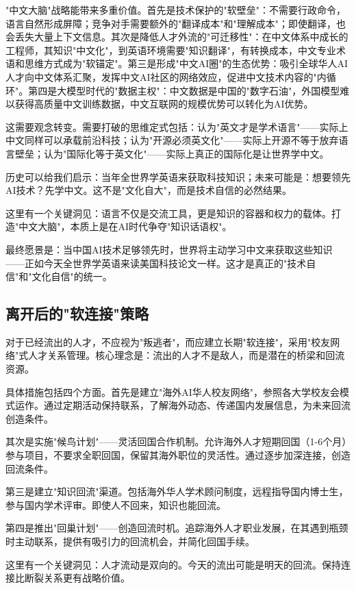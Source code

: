 "中文大脑"战略能带来多重价值。首先是技术保护的"软壁垒"：不需要行政命令，语言自然形成屏障；竞争对手需要额外的"翻译成本"和"理解成本"；即使翻译，也会丢失大量上下文信息。其次是降低人才外流的"可迁移性"：在中文体系中成长的工程师，其知识"中文化"，到英语环境需要"知识翻译"，有转换成本，中文专业术语和思维方式成为"软锚定"。第三是形成"中文AI圈"的生态优势：吸引全球华人AI人才向中文体系汇聚，发挥中文AI社区的网络效应，促进中文技术内容的"内循环"。第四是大模型时代的"数据主权"：中文数据是中国的"数字石油"，外国模型难以获得高质量中文训练数据，中文互联网的规模优势可以转化为AI优势。

这需要观念转变。需要打破的思维定式包括：认为"英文才是学术语言"——实际上中文同样可以承载前沿科技；认为"开源必须英文化"——实际上开源不等于放弃语言壁垒；认为"国际化等于英文化"——实际上真正的国际化是让世界学中文。

历史可以给我们启示：当年全世界学英语来获取科技知识；未来可能是：想要领先AI技术？先学中文。这不是"文化自大"，而是技术自信的必然结果。

这里有一个关键洞见：语言不仅是交流工具，更是知识的容器和权力的载体。打造"中文大脑"，本质上是在AI时代争夺"知识话语权"。

最终愿景是：当中国AI技术足够领先时，世界将主动学习中文来获取这些知识——正如今天全世界学英语来读美国科技论文一样。这才是真正的"技术自信"和"文化自信"的统一。

\subsection{离开后的"软连接"策略}

对于已经流出的人才，不应视为"叛逃者"，而应建立长期"软连接"，采用"校友网络"式人才关系管理。核心理念是：流出的人才不是敌人，而是潜在的桥梁和回流资源。

具体措施包括四个方面。首先是建立"海外AI华人校友网络"，参照各大学校友会模式运作。通过定期活动保持联系，了解海外动态、传递国内发展信息，为未来回流创造条件。

其次是实施"候鸟计划"——灵活回国合作机制。允许海外人才短期回国（1-6个月）参与项目，不要求全职回国，保留其海外职位的灵活性。通过逐步加深连接，创造回流条件。

第三是建立"知识回流"渠道。包括海外华人学术顾问制度，远程指导国内博士生，参与国内学术评审。即使人不回来，知识也能回流。

第四是推出"回巢计划"——创造回流时机。追踪海外人才职业发展，在其遇到瓶颈时主动联系，提供有吸引力的回流机会，并简化回国手续。

这里有一个关键洞见：人才流动是双向的。今天的流出可能是明天的回流。保持连接比断裂关系更有战略价值。


